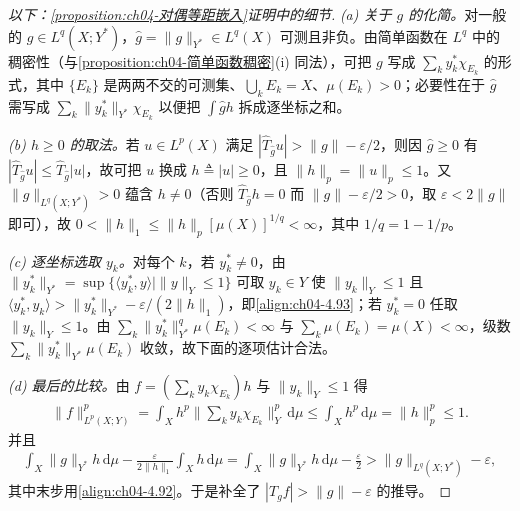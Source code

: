 \documentclass[../../main.tex]{subfiles}%
\begin{document}
\begin{proof}[以下：\cref{proposition:ch04-对偶等距嵌入}证明中的细节]
\emph{(a) 关于 $g$ 的化简。}对一般的 $g\in L^q(X;Y^*)$，$\hat g=\|g\|_{Y^*}\in L^q(X)$ 可测且非负。由简单函数在 $L^q$ 中的稠密性（与\cref{proposition:ch04-简单函数稠密}(i) 同法），可把 $g$ 写成 $\sum_ky_k^*\chi_{E_k}$ 的形式，其中 $\{E_k\}$ 是两两不交的可测集、$\bigcup_kE_k=X$、$\mu(E_k)>0$；必要性在于 $\hat g$ 需写成 $\sum_k\|y_k^*\|_{Y^*}\chi_{E_k}$ 以便把 $\int\hat gh$ 拆成逐坐标之和。

\emph{(b) $h\geqslant0$ 的取法。}若 $u\in L^p(X)$ 满足 $|\widehat T_{\hat g}u|>\|g\|-\varepsilon/2$，则因 $\hat g\geqslant0$ 有 $|\widehat T_{\hat g}u|\leqslant\widehat T_{\hat g}|u|$，故可把 $u$ 换成 $h\triangleq|u|\geqslant0$，且 $\|h\|_p=\|u\|_p\leqslant1$。又 $\|g\|_{L^q(X;Y^*)}>0$ 蕴含 $h\neq0$（否则 $\widehat T_{\hat g}h=0$ 而 $\|g\|-\varepsilon/2>0$，取 $\varepsilon<2\|g\|$ 即可），故 $0<\|h\|_1\leqslant\|h\|_p[\mu(X)]^{1/q}<\infty$，其中 $1/q=1-1/p$。

\emph{(c) 逐坐标选取 $y_k$。}对每个 $k$，若 $y_k^*\neq0$，由 $\|y_k^*\|_{Y^*}=\sup\{\langle y_k^*,y\rangle\mid\|y\|_Y\leqslant1\}$ 可取 $y_k\in Y$ 使 $\|y_k\|_Y\leqslant1$ 且 $\langle y_k^*,y_k\rangle>\|y_k^*\|_{Y^*}-\varepsilon/(2\|h\|_1)$，即\eqref{align:ch04-4.93}；若 $y_k^*=0$ 任取 $\|y_k\|_Y\leqslant1$。由 $\sum_k\|y_k^*\|_{Y^*}^q\mu(E_k)<\infty$ 与 $\sum_k\mu(E_k)=\mu(X)<\infty$，级数 $\sum_k\|y_k^*\|_{Y^*}\mu(E_k)$ 收敛，故下面的逐项估计合法。

\emph{(d) 最后的比较。}由 $f=(\sum_ky_k\chi_{E_k})h$ 与 $\|y_k\|_Y\leqslant1$ 得
\begin{align*}
\|f\|_{L^p(X;Y)}^p=\int_Xh^p\Big\|\sum_ky_k\chi_{E_k}\Big\|_Y^p\,\mathrm{d}\mu\leqslant\int_Xh^p\,\mathrm{d}\mu=\|h\|_p^p\leqslant1.
\end{align*}
并且
\begin{align*}
\int_X\|g\|_{Y^*}h\,\mathrm{d}\mu-\frac{\varepsilon}{2\|h\|_1}\int_Xh\,\mathrm{d}\mu=\int_X\|g\|_{Y^*}h\,\mathrm{d}\mu-\frac{\varepsilon}{2}>\|g\|_{L^q(X;Y^*)}-\varepsilon,
\end{align*}
其中末步用\eqref{align:ch04-4.92}。于是补全了 $|T_gf|>\|g\|-\varepsilon$ 的推导。
\end{proof}
\end{document}
